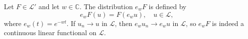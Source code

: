 Let $F \in \mathcal{L}'$ and let $w \in \mathbb{C}$. The distribution $e_w F$ is defined by
$$e_w F(u) = F(e_w u), \quad u \in \mathcal{L},$$
where $e_w(t) = e^{-wt}$. If $u_n \to u$ in $\mathcal{L}$, then $e_w u_n \to e_w u$ in $\mathcal{L}$, so $e_w F$ is indeed a continuous linear functional on $\mathcal{L}$.
